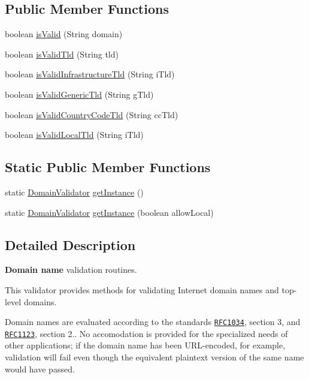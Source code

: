 \subsection*{Public Member Functions}
\begin{DoxyCompactItemize}
\item 
boolean \hyperlink{classDomainValidator_a73165784191fb2f12c0bd5295b8e6004}{is\+Valid} (String domain)
\item 
boolean \hyperlink{classDomainValidator_aa05e0803e9f7390577f072fbeac0afb6}{is\+Valid\+Tld} (String tld)
\item 
boolean \hyperlink{classDomainValidator_acf198e86d538d0c001020ee8ff117b78}{is\+Valid\+Infrastructure\+Tld} (String i\+Tld)
\item 
boolean \hyperlink{classDomainValidator_a4d8d33106c0f174b9402cf78687644a5}{is\+Valid\+Generic\+Tld} (String g\+Tld)
\item 
boolean \hyperlink{classDomainValidator_ada2c219d4cec8346ebefc981a17c6bb9}{is\+Valid\+Country\+Code\+Tld} (String cc\+Tld)
\item 
boolean \hyperlink{classDomainValidator_a504c7f2f180d6cf946e2fe08915f9a88}{is\+Valid\+Local\+Tld} (String i\+Tld)
\end{DoxyCompactItemize}
\subsection*{Static Public Member Functions}
\begin{DoxyCompactItemize}
\item 
static \hyperlink{classDomainValidator}{Domain\+Validator} \hyperlink{classDomainValidator_abfe4cdfd8653602ecfc36c3b38e2dbf8}{get\+Instance} ()
\item 
static \hyperlink{classDomainValidator}{Domain\+Validator} \hyperlink{classDomainValidator_ab2f892047c9988557afbd36b3d4031bf}{get\+Instance} (boolean allow\+Local)
\end{DoxyCompactItemize}


\subsection{Detailed Description}
{\bfseries Domain name} validation routines.

This validator provides methods for validating Internet domain names and top-\/level domains. 

Domain names are evaluated according to the standards \href{http://www.ietf.org/rfc/rfc1034.txt}{\tt R\+F\+C1034}, section 3, and \href{http://www.ietf.org/rfc/rfc1123.txt}{\tt R\+F\+C1123}, section 2.. No accomodation is provided for the specialized needs of other applications; if the domain name has been U\+R\+L-\/encoded, for example, validation will fail even though the equivalent plaintext version of the same name would have passed. 

